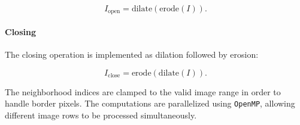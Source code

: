 \[
I_{\text{open}} = \text{dilate}(\text{erode}(I)).
\]

\paragraph{Closing}

The closing operation is implemented as dilation followed by erosion:

\[
I_{\text{close}} = \text{erode}(\text{dilate}(I)).
\]


The neighborhood indices are clamped to the valid image range in order
to handle border pixels. The computations are parallelized using
\texttt{OpenMP}, allowing different image rows to be processed
simultaneously.




